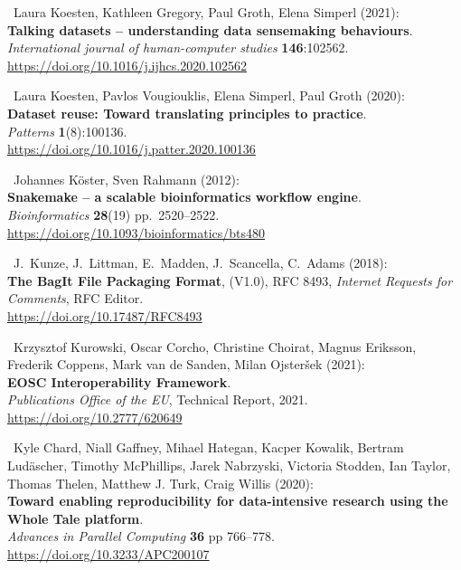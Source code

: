 \begin{thebibliography}{9}
~Laura Koesten, Kathleen Gregory, Paul Groth, Elena Simperl
(2021):\\
\textbf{Talking datasets -- understanding data sensemaking
behaviours}.\\
\emph{International journal of human-computer studies}
\textbf{146}:102562.\\
\url{https://doi.org/10.1016/j.ijhcs.2020.102562}

~Laura Koesten, Pavlos Vougiouklis, Elena Simperl, Paul Groth
(2020):\\
\textbf{Dataset reuse: Toward translating principles to practice}.\\
\emph{Patterns} \textbf{1}(8):100136.\\
\url{https://doi.org/10.1016/j.patter.2020.100136}

~Johannes Köster, Sven Rahmann (2012):\\
\textbf{Snakemake -- a scalable bioinformatics workflow engine}.\\
\emph{Bioinformatics} \textbf{28}(19) pp.~2520--2522.\\
\url{https://doi.org/10.1093/bioinformatics/bts480}

~J.~Kunze, J.~Littman, E.~Madden, J.~Scancella, C.~Adams
(2018):\\
\textbf{The BagIt File Packaging Format}, (V1.0), RFC 8493,
\emph{Internet Requests for Comments}, RFC Editor.\\
\url{https://doi.org/10.17487/RFC8493}

~Krzysztof Kurowski, Oscar Corcho, Christine Choirat, Magnus
Eriksson, Frederik Coppens, Mark van de Sanden, Milan Ojsteršek
(2021):\\
\textbf{EOSC Interoperability Framework}.\\
\emph{Publications Office of the EU}, Technical Report, 2021.\\
\url{https://doi.org/10.2777/620649}

~Kyle Chard, Niall Gaffney, Mihael Hategan, Kacper Kowalik,
Bertram Ludäscher, Timothy McPhillips, Jarek Nabrzyski, Victoria
Stodden, Ian Taylor, Thomas Thelen, Matthew J. Turk, Craig Willis
(2020):\\
\textbf{Toward enabling reproducibility for data-intensive research
using the Whole Tale platform}.\\
\emph{Advances in Parallel Computing} \textbf{36} pp 766--778.\\
\url{https://doi.org/10.3233/APC200107}


\end{thebibliography}
